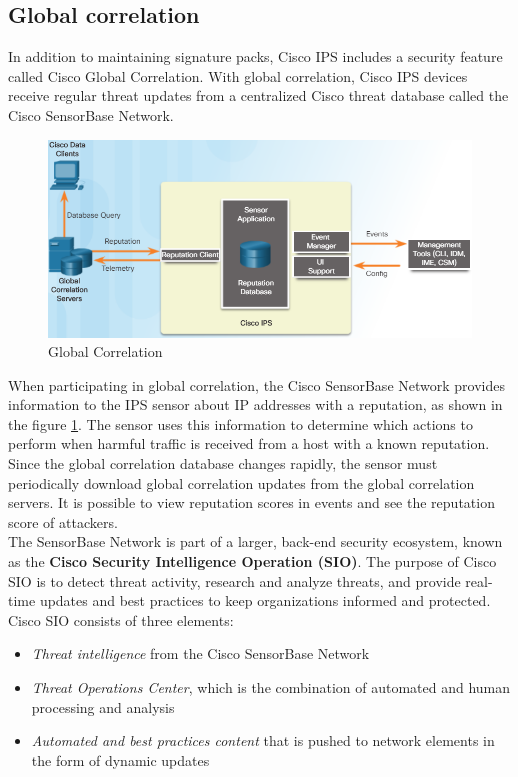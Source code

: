 \subsection{Global correlation}

In addition to maintaining signature packs, Cisco IPS includes a security feature called Cisco Global Correlation. With global correlation, Cisco IPS devices receive regular threat updates from a centralized Cisco threat database called the Cisco SensorBase Network. \\

\begin{figure}[hbtp]
\caption{Global Correlation}\label{GlobalCorrelation}
\centering
\includegraphics[scale=1]{pictures/GlobalCorrelation.PNG}
\end{figure}

When participating in global correlation, the Cisco SensorBase Network provides information to the IPS sensor about IP addresses with a reputation, as shown in the figure \ref{GlobalCorrelation}. The sensor uses this information to determine which actions to perform when harmful traffic is received from a host with a known reputation. Since the global correlation database changes rapidly, the sensor must periodically download global correlation updates from the global correlation servers. It is possible to view reputation scores in events and see the reputation score of attackers.\\

The SensorBase Network is part of a larger, back-end security ecosystem, known as the \textbf{Cisco Security Intelligence Operation (SIO)}. The purpose of Cisco SIO is to detect threat activity, research and analyze threats, and provide real-time updates and best practices to keep organizations informed and protected. Cisco SIO consists of three elements:

\begin{itemize}
\item \emph{Threat intelligence} from the Cisco SensorBase Network
\item \emph{Threat Operations Center}, which is the combination of automated and human processing and analysis
\item \emph{Automated and best practices content} that is pushed to network elements in the form of dynamic updates
\end{itemize}

